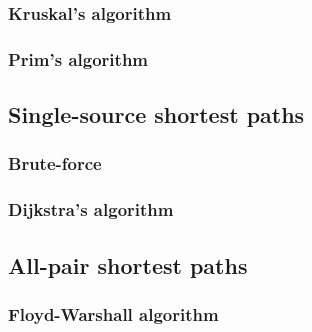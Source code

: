 \subsubsection{Kruskal's algorithm}

\subsubsection{Prim's algorithm}

\subsection{Single-source shortest paths}

\subsubsection{Brute-force}

\subsubsection{Dijkstra's algorithm}

\subsection{All-pair shortest paths}

\subsubsection{Floyd-Warshall algorithm}